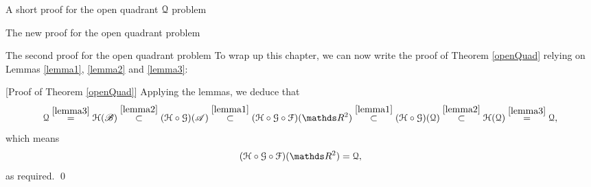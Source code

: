 \documentclass[11pt, a4paper, english, twoside, notitlepage, openright]{report}
\begin{document}
\begin{chapter}{A short proof for the open quadrant $\mathcal{Q}$ problem}
\begin{section}{The new proof for the open quadrant problem}
\begin{subsection}{The second proof for the open quadrant problem}
To wrap up this chapter, we can now write the proof of Theorem \ref{openQuad} relying on Lemmas \ref{lemma1}, \ref{lemma2} and \ref{lemma3}:

\vspace{1mm}

[Proof of Theorem \ref{openQuad}] Applying the lemmas, we deduce that
$$
\Qu \overset{\ref{lemma3}}{=}\HH(\mathscr{B})\overset{\ref{lemma2}}{\subset}(\HH\circ\GG)(\mathscr{A}) \overset{\ref{lemma1}}{\subset}(\HH\circ\GG\circ\FF)(\R^2)\overset{\ref{lemma1}}{\subset}(\HH\circ\GG)(\Qu) \overset{\ref{lemma2}}{\subset}\HH(\Qu)\overset{\ref{lemma3}}{=}\Qu,
$$
which means 
$$
(\HH\circ\GG\circ\FF)(\R^2)=\Qu,
$$
as required.
\qed
\end{subsection}



\end{section}
\end{chapter}
\end{document}
